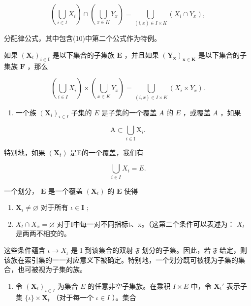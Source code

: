 \[
\left(\bigcup_ {i \in I} X _ {i}\right) \cap \left(\bigcup_ {x \in K} Y _ {x}\right) = \bigcup_ {(i, x) \in I \times K} (X _ {i} \cap Y _ {x}),\tag{37}
\]

分配律公式，其中包含(10)中第二个公式作为特例。

如果 \((\mathbf{X}_t)_{i\in \mathbf{I}}\) 是以下集合的子集族 \(\mathbf{E}\) ，并且如果 \((\mathbf{Y}_{\mathbf{x}})_{\mathbf{x}\in \mathbf{K}}\) 是以下集合的子集族 \(\mathbf{F}\) ，那么

\[
\left(\bigcup_ {i \in I} X _ {i}\right) \times \left(\bigcup_ {x \in K} Y _ {x}\right) = \bigcup_ {(i, x) \in I \times K} (X _ {i} \times Y _ {x}).\tag{38}
\]

\begin{enumerate}
\def\labelenumi{\arabic{enumi}.}
\setcounter{enumi}{3}
\tightlist
\item
  一个族 \((\mathbf{X}_i)_{i\in I}\) 子集的 \(E\) 是子集的一个覆盖 \(A\) 的 \(E\) ，或覆盖 \(A\) ，如果
\end{enumerate}

\[
\mathrm{A} \subset \bigcup_ {i \in \mathrm{I}} \mathrm{X} _ {i}.
\]

特别地，如果 \((\mathbf{X}_{t})\) 是E的一个覆盖，我们有

\[
\bigcup_ {i \in I} X _ {i} = E.
\]

一个划分， \(\mathbf{E}\) 是一个覆盖 \((\mathbf{X}_t)\) 的 \(\mathbf{E}\) 使得

\begin{enumerate}
\def\labelenumi{(\alph{enumi})}
\item
  \(\mathbf{X}_{\iota} \neq \varnothing\) 对于所有 \(\iota \in \mathbf{I}\) ;
\item
  \(X_{t} \cap X_{x} = \varnothing\) 对于I中每一对不同指标t、x。（这第二个条件可以表述为： \(X_{t}\) 是两两不相交的。
\end{enumerate}

这些条件蕴含 \(\iota \to X_{\iota}\) 是 I 到该集合的双射 \(\mathfrak{F}\) 划分的子集。因此，若 \(\mathfrak{F}\) 给定，则该族在索引集的一一对应意义下被确定。特别地，一个划分既可被视为子集的集合，也可被视为子集的族。

\begin{enumerate}
\def\labelenumi{\arabic{enumi}.}
\setcounter{enumi}{4}
\tightlist
\item
  令 \((\mathbf{X}_t)_{i \in I}\) 为集合 \(E\) 的任意非空子集族。在乘积 \(I \times E\) 中，令 \(\mathbf{X}_t'\) 表示子集 \(\{\iota\} \times \mathbf{X}_t\) （对于每一个 \(\iota \in I\) ）。集合
\end{enumerate}


